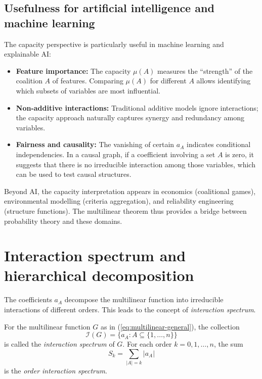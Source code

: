 \subsection{Usefulness for artificial intelligence and machine learning}

The capacity perspective is particularly useful in machine learning and explainable AI:

\begin{itemize}
    \item \textbf{Feature importance:} The capacity \(\mu(A)\) measures the “strength” of the coalition \(A\) of features. Comparing \(\mu(A)\) for different \(A\) allows identifying which subsets of variables are most influential.
    \item \textbf{Non-additive interactions:} Traditional additive models ignore interactions; the capacity approach naturally captures synergy and redundancy among variables.
    \item \textbf{Fairness and causality:} The vanishing of certain \(a_A\) indicates conditional independencies. In a causal graph, if a coefficient involving a set \(A\) is zero, it suggests that there is no irreducible interaction among those variables, which can be used to test causal structures.
\end{itemize}

Beyond AI, the capacity interpretation appears in economics (coalitional games), environmental modelling (criteria aggregation), and reliability engineering (structure functions). The multilinear theorem thus provides a bridge between probability theory and these domains.

\section{Interaction spectrum and hierarchical decomposition}
\label{sec:interaction-spectrum}

The coefficients \(a_A\) decompose the multilinear function into irreducible interactions of different orders. This leads to the concept of \emph{interaction spectrum}.

\begin{definition}
For the multilinear function \(G\) as in (\ref{eq:multilinear-general}), the collection
\[
\mathcal{I}(G) = \{ a_A : A\subseteq\{1,\ldots,n\} \}
\]
is called the \emph{interaction spectrum} of \(G\). For each order \(k = 0,1,\ldots,n\), the sum
\[
S_k = \sum_{|A|=k} |a_A|
\]
is the \emph{order interaction spectrum}.
\end{definition}

